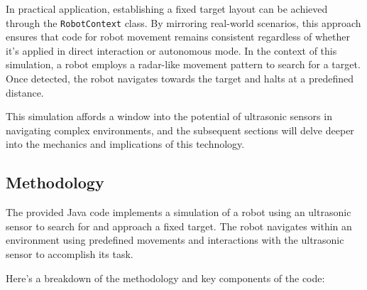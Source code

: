 In practical application, establishing a fixed target layout can be achieved through the \texttt{RobotContext} class. By mirroring real-world scenarios, this approach ensures that code for robot movement remains consistent regardless of whether it's applied in direct interaction or autonomous mode. In the context of this simulation, a robot employs a radar-like movement pattern to search for a target. Once detected, the robot navigates towards the target and halts at a predefined distance.

This simulation affords a window into the potential of ultrasonic sensors in navigating complex environments, and the subsequent sections will delve deeper into the mechanics and implications of this technology.

\subsection{Methodology}

The provided Java code implements a simulation of a robot using an ultrasonic sensor to search for and approach a fixed target. The robot navigates within an environment using predefined movements and interactions with the ultrasonic sensor to accomplish its task.

Here's a breakdown of the methodology and key components of the code:

